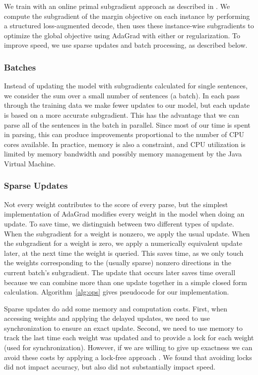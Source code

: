 We train with an online primal subgradient approach \parencite{Ratliff:2007} as described in \textcite{Kummerfeld-etal:2015:EMNLP}.
We compute the subgradient of the margin objective on each instance by performing a structured loss-augmented decode, then uses these instance-wise subgradients to optimize the global objective using AdaGrad \parencite{Duchi:2011} with either \Lone or \Ltwo regularization.
To improve speed, we use sparse updates and batch processing, as described below.

\subsubsection{Batches}

Instead of updating the model with subgradients calculated for single sentences, we consider the sum over a small number of sentences (a batch).
In each pass through the training data we make fewer updates to our model, but each update is based on a more accurate subgradient.
This has the advantage that we can parse all of the sentences in the batch in parallel.
Since most of our time is spent in parsing, this can produce improvements proportional to the number of CPU cores available.
In practice, memory is also a constraint, and CPU utilization is limited by memory bandwidth and possibly memory management by the Java Virtual Machine.

\subsubsection{Sparse Updates}

Not every weight contributes to the score of every parse, but the simplest implementation of AdaGrad modifies every weight in the model when doing an update.
To save time, we distinguish between two different types of update.
When the subgradient for a weight is nonzero, we apply the usual update.
When the subgradient for a weight is zero, we apply a numerically equivalent update later, at the next time the weight is queried.
This saves time, as we only touch the weights corresponding to the (usually sparse) nonzero directions in the current batch's subgradient.
The update that occurs later saves time overall because we can combine more than one update together in a simple closed form calculation.
Algorithm~\ref{alg:ops} gives pseudocode for our implementation.

Sparse updates do add some memory and computation costs.
First, when accessing weights and applying the delayed updates, we need to use synchronization to ensure an exact update.
Second, we need to use memory to track the last time each weight was updated and to provide a lock for each weight (used for synchronization).
However, if we are willing to give up exactness we can avoid these costs by applying a lock-free approach \parencite{hogwild}.
We found that avoiding locks did not impact accuracy, but also did not substantially impact speed.

